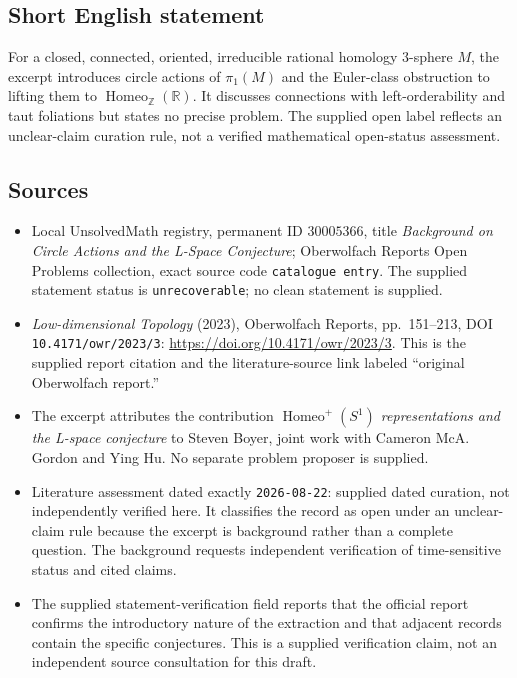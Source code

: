 \documentclass[11pt]{article}
\newcommand{\Z}{\mathbb{Z}}
\newcommand{\R}{\mathbb{R}}
\begin{document}
\subsection{Short English statement}
For a closed, connected, oriented, irreducible rational homology \(3\)-sphere \(M\), the excerpt introduces circle actions of \(\pi_1(M)\) and the Euler-class obstruction to lifting them to \(\operatorname{Homeo}_{\Z}(\R)\). It discusses connections with left-orderability and taut foliations but states no precise problem. The supplied open label reflects an unclear-claim curation rule, not a verified mathematical open-status assessment.
\subsection{Sources}
\begin{itemize}
\item Local UnsolvedMath registry, permanent ID \(30005366\), title \emph{Background on Circle Actions and the L-Space Conjecture}; Oberwolfach Reports Open Problems collection, exact source code \texttt{catalogue entry}. The supplied statement status is \texttt{unrecoverable}; no clean statement is supplied.
\item \emph{Low-dimensional Topology} (2023), Oberwolfach Reports, pp.\ 151--213, DOI \texttt{10.4171/owr/2023/3}: \url{https://doi.org/10.4171/owr/2023/3}. This is the supplied report citation and the literature-source link labeled ``original Oberwolfach report.''
\item The excerpt attributes the contribution \emph{\(\operatorname{Homeo}^{+}(S^1)\) representations and the L-space conjecture} to Steven Boyer, joint work with Cameron McA. Gordon and Ying Hu. No separate problem proposer is supplied.
\item Literature assessment dated exactly \texttt{2026-08-22}: supplied dated curation, not independently verified here. It classifies the record as open under an unclear-claim rule because the excerpt is background rather than a complete question. The background requests independent verification of time-sensitive status and cited claims.
\item The supplied statement-verification field reports that the official report confirms the introductory nature of the extraction and that adjacent records contain the specific conjectures. This is a supplied verification claim, not an independent source consultation for this draft.
\end{itemize}
\end{document}
